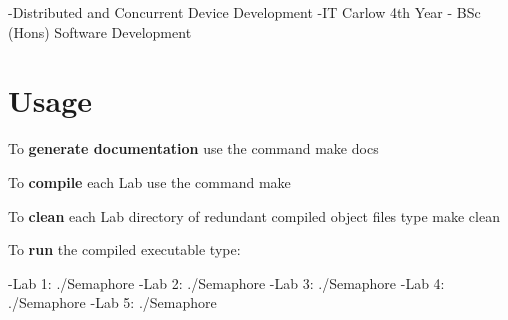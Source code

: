 -\/\+Distributed and Concurrent Device Development -\/\+IT Carlow 4th Year -\/ B\+Sc (Hons) Software Development

\section*{Usage}

To {\bfseries generate documentation} use the command make {\ttfamily docs}

To {\bfseries compile} each Lab use the command {\ttfamily make}

To {\bfseries clean} each Lab directory of redundant compiled object files type {\ttfamily make clean}

To {\bfseries run} the compiled executable type\+:

-\/\+Lab 1\+: {\ttfamily ./\+Semaphore} -\/\+Lab 2\+: {\ttfamily ./\+Semaphore} -\/\+Lab 3\+: {\ttfamily ./\+Semaphore} -\/\+Lab 4\+: {\ttfamily ./\+Semaphore} -\/\+Lab 5\+: {\ttfamily ./\+Semaphore} 